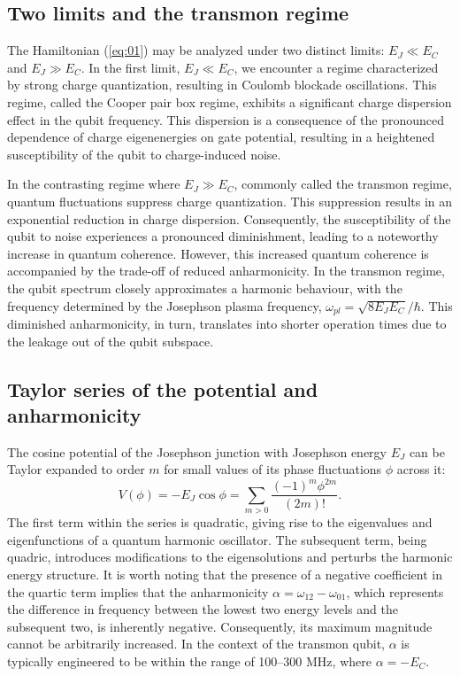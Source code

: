 \documentclass[lettersize,journal]{IEEEtran}
\begin{document}
\subsection{Two limits and the transmon regime}

The Hamiltonian (\ref{eq:01}) may be analyzed under two distinct limits: $E_J \ll E_C$ and $E_J \gg E_C$.
In the first limit, $E_J \ll E_C$, we encounter a regime characterized by strong charge quantization, resulting in Coulomb blockade oscillations. 
This regime, called the Cooper pair box regime, exhibits a significant charge dispersion effect in the qubit frequency. This dispersion is a consequence of the pronounced dependence of charge eigenenergies on gate potential, resulting in a heightened susceptibility of the qubit to charge-induced noise.

In the contrasting regime where $E_J \gg E_C$, commonly called the transmon regime, quantum fluctuations suppress charge quantization. 
This suppression results in an exponential reduction in charge dispersion. Consequently, the susceptibility of the qubit to noise experiences a pronounced diminishment, leading to a noteworthy increase in quantum coherence.
However, this increased quantum coherence is accompanied by the trade-off of reduced anharmonicity. 
In the transmon regime, the qubit spectrum closely approximates a harmonic behaviour, with the frequency determined by the Josephson plasma frequency, $\omega_{pl} = \sqrt{8 E_J E_C} / \hbar$.
This diminished anharmonicity, in turn, translates into shorter operation times due to the leakage out of the qubit subspace.

\subsection{Taylor series of the potential and anharmonicity}

The cosine potential of the Josephson junction with Josephson energy $E_J$ can be Taylor expanded to order $m$ for small values of its phase fluctuations $\phi$ across it:
\begin{equation} \label{eq:02}
   V(\phi) = - E_J \cos \phi = \sum_{m > 0} \frac{(-1)^{m} \phi^{2m}}{(2m)!}.
\end{equation}
The first term within the series is quadratic, giving rise to the eigenvalues and eigenfunctions of a quantum harmonic oscillator.
The subsequent term, being quadric, introduces modifications to the eigensolutions and perturbs the harmonic energy structure.
It is worth noting that the presence of a negative coefficient in the quartic term implies that the anharmonicity $\alpha = \omega_{12} - \omega_{01}$, which represents the difference in frequency between the lowest two energy levels and the subsequent two, is inherently negative. 
Consequently, its maximum magnitude cannot be arbitrarily increased. 
In the context of the transmon qubit, $\alpha$ is typically engineered to be within the range of 100–300 MHz, where $\alpha = -E_C$.
\end{document}
